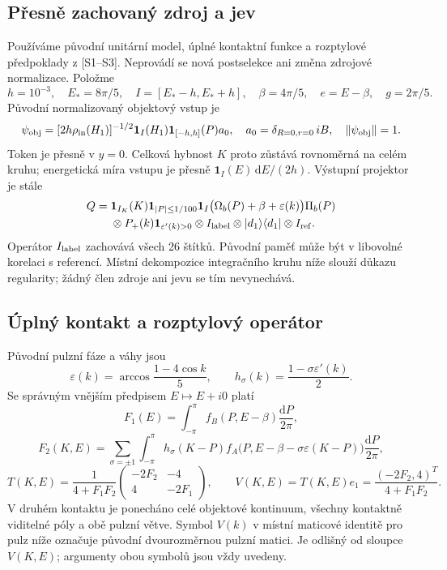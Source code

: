 \documentclass[11pt,a4paper]{article}
\theoremstyle{remark}\newtheorem{remark}[theorem]{Poznámka}
\numberwithin{equation}{section}
\begin{document}
\subsection{Přesně zachovaný zdroj a jev}

Používáme původní unitární model, úplné kontaktní funkce
a rozptylové předpoklady z [S1--S3]. Neprovádí se nová
postselekce ani změna zdrojové normalizace. Položme
\[
h=10^{-3},\quad E_*=8\pi/5,\quad I=[E_*-h,E_*+h],
\quad \beta=4\pi/5,\quad e=E-\beta,\quad g=2\pi/5.
\]
Původní normalizovaný objektový vstup je
\[
\psi_{\rm obj}
=[2h\rho_{\rm in}(H_1)]^{-1/2}
\mathbf1_I(H_1)\mathbf1_{[-h,h]}(P)a_0,
\quad a_0=\delta_{R=0,r=0}\,iB,
\quad \|\psi_{\rm obj}\|=1.
\]
Token je přesně v \(y=0\). Celková hybnost \(K\) proto
zůstává rovnoměrná na celém kruhu; energetická míra vstupu
je přesně \(\mathbf1_I(E)\,\mathrm dE/(2h)\).
Výstupní projektor je stále
\[
\begin{aligned}
Q={}&\mathbf1_{I_K}(K)\mathbf1_{|P|\le1/100}
\mathbf1_I\bigl(\Omega_b(P)+\beta+\varepsilon(k)\bigr)\Pi_b(P)\\
&\otimes P_+(k)\mathbf1_{\varepsilon'(k)>0}
\otimes I_{\rm label}\otimes|d_1\rangle\langle d_1|
\otimes I_{\rm ref}.
\end{aligned}
\]
Operátor \(I_{\rm label}\) zachovává všech 26 štítků.
Původní paměť může být v libovolné korelaci s referencí.
Místní dekompozice integračního kruhu níže slouží důkazu
regularity; žádný člen zdroje ani jevu se tím nevynechává.

\subsection{Úplný kontakt a rozptylový operátor}

Původní pulzní fáze a váhy jsou
\[
\varepsilon(k)=\arccos\frac{1-4\cos k}{5},\qquad
h_\sigma(k)=\frac{1-\sigma\varepsilon'(k)}2.
\]
Se správným vnějším předpisem \(E\mapsto E+i0\) platí
\[
F_1(E)=\int_{-\pi}^{\pi}f_B(P,E-\beta)\frac{\mathrm dP}{2\pi},
\]
\[
F_2(K,E)=\sum_{\sigma=\pm1}\int_{-\pi}^{\pi}
h_\sigma(K-P)f_A\bigl(P,E-\beta-\sigma\varepsilon(K-P)\bigr)
\frac{\mathrm dP}{2\pi},
\]
\[
T(K,E)=\frac1{4+F_1F_2}
\begin{pmatrix}-2F_2&-4\\4&-2F_1\end{pmatrix},\qquad
V(K,E)=T(K,E)e_1=\frac{(-2F_2,4)^T}{4+F_1F_2}.
\]
V druhém kontaktu je ponecháno celé objektové kontinuum,
všechny kontaktně viditelné póly a obě pulzní větve. Symbol
\(V(k)\) v místní maticové identitě pro pulz níže označuje
původní dvourozměrnou pulzní matici. Je odlišný od sloupce
\(V(K,E)\); argumenty obou symbolů jsou vždy uvedeny.
\end{document}
